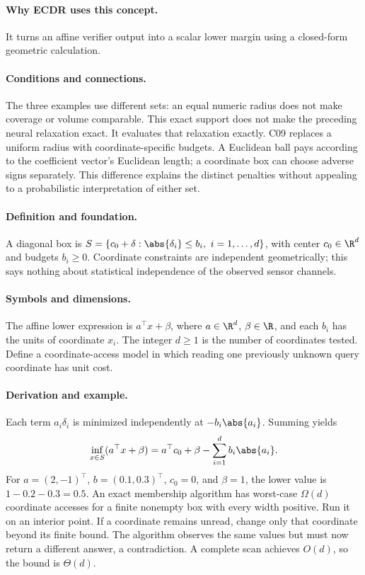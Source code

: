 \paragraph{Why ECDR uses this concept.}
It turns an affine verifier output into a scalar lower margin using a closed-form geometric calculation.
\paragraph{Conditions and connections.}
The three examples use different sets: an equal numeric radius does not make coverage or volume comparable. This exact support does not make the preceding neural relaxation exact. It evaluates that relaxation exactly. C09 replaces a uniform radius with coordinate-specific budgets. A Euclidean ball pays according to the coefficient vector's Euclidean length; a coordinate box can choose adverse signs separately. This difference explains the distinct penalties without appealing to a probabilistic interpretation of either set.

\paragraph{Definition and foundation.}
A diagonal box is $S=\{c_0+\delta:\abs{\delta_i}\le b_i,\ i=1,\ldots,d\}$, with center $c_0\in\R^d$ and budgets $b_i\ge0$. Coordinate constraints are independent geometrically; this says nothing about statistical independence of the observed sensor channels.
\paragraph{Symbols and dimensions.}
The affine lower expression is $a^\top x+\beta$, where $a\in\R^d$, $\beta\in\R$, and each $b_i$ has the units of coordinate $x_i$. The integer $d\ge1$ is the number of coordinates tested. Define a coordinate-access model in which reading one previously unknown query coordinate has unit cost.
\paragraph{Derivation and example.}
Each term $a_i\delta_i$ is minimized independently at $-b_i\abs{a_i}$. Summing yields
\[
 \inf_{x\in S}(a^\top x+\beta)
 =a^\top c_0+\beta-\sum_{i=1}^d b_i\abs{a_i}.
\]
For $a=(2,-1)^\top$, $b=(0.1,0.3)^\top$, $c_0=0$, and $\beta=1$, the lower value is $1-0.2-0.3=0.5$.
An exact membership algorithm has worst-case $\Omega(d)$ coordinate accesses for a finite nonempty box with every width positive. Run it on an interior point. If a coordinate remains unread, change only that coordinate beyond its finite bound. The algorithm observes the same values but must now return a different answer, a contradiction. A complete scan achieves $O(d)$, so the bound is $\Theta(d)$.
